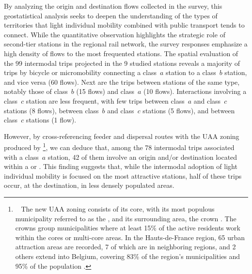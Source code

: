 \begin{refsegment}
By analyzing the origin and destination flows collected in the survey, this geostatistical analysis seeks to deepen the understanding of the types of territories that light individual mobility combined with public transport tends to connect. While the quantitative observation highlights the strategic role of second-tier stations in the regional rail network, the survey responses emphasize a high density of flows to the most frequented stations. The spatial evaluation of the 99 intermodal trips projected in the 9 studied stations reveals a majority of trips by bicycle or micromobility connecting a class~\(a\) station to a class~\(b\) station, and vice versa (60 flows). Next are the trips between stations of the same type, notably those of class~\(b\) (15 flows) and class~\(a\) (10 flows). Interactions involving a class~\(c\) station are less frequent, with few trips between class~\(a\) and class~\(c\) stations (8 flows), between class~\(b\) and class~\(c\) stations (5 flows), and between class~\(c\) stations (1 flow).%

However, by cross-referencing feeder and dispersal routes with the \acrfull{UAA} zoning produced by \textcolor{blue}{\textcite{insee_nouveau_2020}}\footnote{~
    The new \acrfull{UAA} zoning consists of its core, with its most populous municipality referred to as the , and its surrounding area, the crown \textcolor{blue}{\autocite{insee_nouveau_2020}}. The crowns group municipalities where at least 15\% of the active residents work within the cores or multi-core areas. 
    In the Hauts-de-France region, 65 urban attraction areas are recorded, 7 of which are in neighboring regions, and 2 others extend into Belgium, covering 83\% of the region's municipalities and 95\% of the population \textcolor{blue}{\autocite{insee_plus_2020}}.
}, we can deduce that, among the 78 intermodal trips associated with a class~\(a\) station, 42 of them involve an origin and/or destination located within a  or . This finding suggests that, while the intermodal adoption of light individual mobility is focused on the most attractive stations, half of these trips occur, at the destination, in less densely populated areas.%


\end{refsegment}
